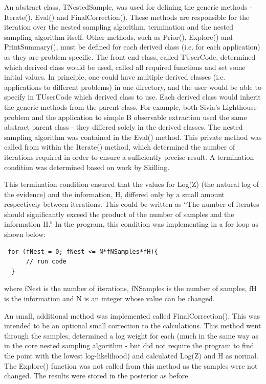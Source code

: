 \documentclass[a4paper,12pt]{article}
\begin{document}
An abstract class, TNestedSample, was used for defining the generic methods - Iterate(), Eval() and FinalCorrection().  These methods are responsible for the iteration over the nested sampling algorithm, termination and the nested sampling algorithm itself.  Other methods, such as Prior(), Explore() and PrintSummary(), must be defined for each derived class (i.e. for each application) as they are problem-specific.  The front end class, called TUserCode, determined which derived class would be used, called all required functions and set some initial values.  In principle, one could have multiple derived classes (i.e. applications to different problems) in one directory, and the user would be able to specify in TUserCode which derived class to use.  Each derived class would inherit the generic methods from the parent class.  For example, both Sivia's Lighthouse problem and the application to simple B observable extraction used the same abstract parent class - they differed solely in the derived classes.  
\newline
The nested sampling algorithm was contained in the Eval() method.  This private method was called from within the Iterate() method, which determined the number of iterations required in order to ensure a sufficiently precise result. A termination condition was determined based on work by Skilling\cite{skilling}.


This termination condition ensured that the values for Log(Z) (the natural log of the evidence) and the information, H, differed only by a small amount respectively between iterations.  This could be written as ``The number of iterates should significantly exceed the product of the number of samples and the information H.''\cite{skilling}
\newline
In the program, this condition was implementing in a for loop as shown below:
\newline
\begin{verbatim}
 for (fNest = 0; fNest <= N*fNSamples*fH){
      // run code
  }
\end{verbatim}
where fNest is the number of iterations, fNSamples is the number of samples, fH is the information and N is an integer whose value can be changed.  

An small, additional method was implemented called FinalCorrection().  This was intended to be an optional small correction to the calculations.  This method went through the samples, determined a log weight for each (much in the same way as in the core nested sampling algorithm - but did not require the program to find the point with the lowest log-likelihood) and calculated Log(Z) and H as normal.  The Explore() function was not called from this method as the samples were not changed.  The results were stored in the posterior as before.  
\end{document}
